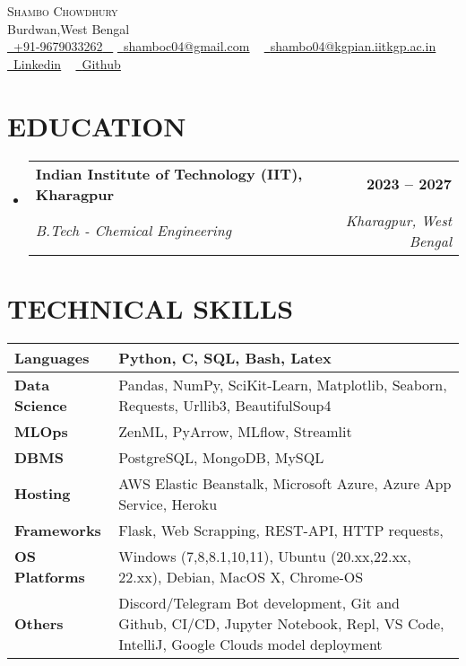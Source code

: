 \documentclass[letterpaper,11pt]{article}
\makeatletter
\newcommand{\resumeSubheading}[4]{
  \vspace{-2pt}\item
    \begin{tabular*}{1.0\textwidth}[t]{l@{\extracolsep{\fill}}r}
      \textbf{\large#1} & \textbf{\small #2} \\
      \textit{\large#3} & \textit{\small #4} \\
      
    \end{tabular*}\vspace{-7pt}
}
\newcommand{\resumeSubHeadingListStart}{\begin{itemize}[leftmargin=0.0in, label={}]}
\newcommand{\resumeSubHeadingListEnd}{\end{itemize}}
\makeatother
\begin{document}


\begin{center}
    {\Huge \scshape Shambo Chowdhury} \\ \vspace{1pt}
    Burdwan,West Bengal \\ \vspace{1pt}
    \small \href{tel:#}{ \raisebox{-0.1\height}\faPhone\ \underline{+91-9679033262} ~} 
    \href{mailto:shamboc04@gmail.com}{\raisebox{-0.2\height}\faEnvelope\  \underline{shamboc04@gmail.com}} ~ 
    \href{mailto:shambo04@kgpian.iitkgp.ac.in}{\raisebox{-0.2\height}\faEnvelope\  \underline{shambo04@kgpian.iitkgp.ac.in}} ~ 
    \href{https://linkedin.com/in/shambo04}{\raisebox{-0.2\height}\faLinkedinSquare\ \underline{Linkedin}}  ~
    \href{https://github.com/typhonshambo}{\raisebox{-0.2\height}\faGithub\ \underline{Github}} ~

\end{center}
 \vspace{0.5mm}


\section{EDUCATION}
  \resumeSubHeadingListStart
    \resumeSubheading
      {Indian Institute of Technology (IIT), Kharagpur}{2023 – 2027}
      {B.Tech - Chemical Engineering}{Kharagpur, West Bengal}
  \resumeSubHeadingListEnd
  

\section{TECHNICAL SKILLS}
\vspace{-5pt}
\begin{center}
\renewcommand{\arraystretch}{1.2}
\begin{tabularx}{\textwidth}{l|p{15cm}}
\hline
\textbf{Languages} & Python, C, SQL, Bash, Latex \\
\hline
\textbf{Data Science} & Pandas, NumPy, SciKit-Learn, Matplotlib, Seaborn, Requests, Urllib3, BeautifulSoup4 \\
\hline
\textbf{MLOps} & ZenML, PyArrow, MLflow, Streamlit \\
\hline
\textbf{DBMS} & PostgreSQL, MongoDB, MySQL \\
\hline
\textbf{Hosting} & AWS Elastic Beanstalk, Microsoft Azure, Azure App Service, Heroku \\
\hline
\textbf{Frameworks} & Flask, Web Scrapping, REST-API, HTTP requests, \\
\hline
\textbf{OS Platforms} & Windows (7,8,8.1,10,11), Ubuntu (20.xx,22.xx, 22.xx), Debian, MacOS X, Chrome-OS \\
\hline
\textbf{Others} & Discord/Telegram Bot development, Git and Github, CI/CD, Jupyter Notebook, Repl, VS Code, IntelliJ, Google Clouds model deployment \\
\hline
\end{tabularx}
\end{center}
\end{document}
